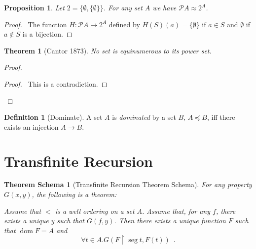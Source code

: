 \documentclass{book}
\let\qed\relax
\newtheorem{prop}[ax]{Proposition}
\newtheorem{thm}[ax]{Theorem}
\newtheorem{thms}[ax]{Theorem Schema}
\theoremstyle{definition}
\newtheorem{df}[ax]{Definition}
\newcommand{\dom}{\ensuremath{\operatorname{dom}}}
\newcommand{\seg}{\ensuremath{\operatorname{seg}}}
\begin{document}
\begin{prop}
Let $2 = \{ \emptyset, \{ \emptyset\} \}$. 
For any set $A$ we have $\mathcal{P} A \approx 2^A$.
\end{prop}

\begin{proof}
\pf\ The function $H : \mathcal{P} A \rightarrow 2^A$ defined by $H(S)(a) = \{\emptyset\}$ if $a \in S$ and $\emptyset$ if $a \notin S$ is a bijection. \qed
\end{proof}

\begin{thm}[Cantor 1873]
No set is equinumerous to its power set.
\end{thm}

\begin{proof}
\pf
{}
\qedstep
\begin{proof}
	\pf\ This is a contradiction.
\end{proof}
\qed
\end{proof}

\begin{df}[Dominate]
A set $A$ is \emph{dominated} by a set $B$, $A \preccurlyeq B$, iff there exists an injection $A \rightarrow B$.
\end{df}

\section{Transfinite Recursion}

\begin{thms}[Transfinite Recursion Theorem Schema]
For any property $G(x,y)$, the following is a theorem:

Assume that $<$ is a well ordering on a set $A$. Assume that, for any $f$, there exists a unique $y$ such that $G(f,y)$. Then there exists a unique function $F$ such that $\dom F = A$ and
\[ \forall t \in A. G(F \restriction \seg t, F(t)) \enspace . \]
\end{thms}
\end{document}
